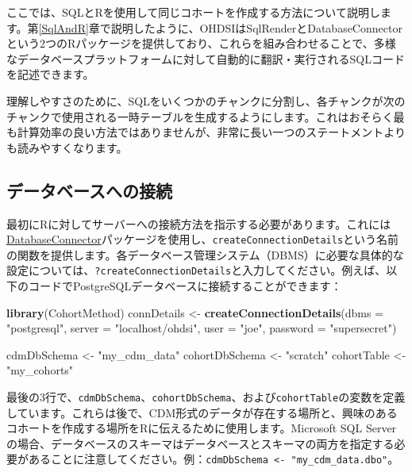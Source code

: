 \documentclass[
  11pt]{book}
\newenvironment{Shaded}{\begin{snugshade}}{\end{snugshade}}
\newcommand{\AttributeTok}[1]{\textcolor[rgb]{0.13,0.29,0.53}{#1}}
\newcommand{\FunctionTok}[1]{\textcolor[rgb]{0.13,0.29,0.53}{\textbf{#1}}}
\newcommand{\NormalTok}[1]{#1}
\newcommand{\OtherTok}[1]{\textcolor[rgb]{0.56,0.35,0.01}{#1}}
\newcommand{\StringTok}[1]{\textcolor[rgb]{0.31,0.60,0.02}{#1}}
\theoremstyle{definition}
\theoremstyle{definition}
\theoremstyle{definition}
\theoremstyle{definition}
\theoremstyle{remark}
\begin{document}
ここでは、SQLとRを使用して同じコホートを作成する方法について説明します。第\ref{SqlAndR}章で説明したように、OHDSIはSqlRenderとDatabaseConnectorという2つのRパッケージを提供しており、これらを組み合わせることで、多様なデータベースプラットフォームに対して自動的に翻訳・実行されるSQLコードを記述できます。

理解しやすさのために、SQLをいくつかのチャンクに分割し、各チャンクが次のチャンクで使用される一時テーブルを生成するようにします。これはおそらく最も計算効率の良い方法ではありませんが、非常に長い一つのステートメントよりも読みやすくなります。

\subsection{データベースへの接続}\label{ux30c7ux30fcux30bfux30d9ux30fcux30b9ux3078ux306eux63a5ux7d9a-1}

最初にRに対してサーバーへの接続方法を指示する必要があります。これには\href{https://ohdsi.github.io/DatabaseConnector/}{DatabaseConnector}パッケージを使用し、\texttt{createConnectionDetails}という名前の関数を提供します。各データベース管理システム（DBMS）に必要な具体的な設定については、\texttt{?createConnectionDetails}と入力してください。例えば、以下のコードでPostgreSQLデータベースに接続することができます：

\begin{Shaded}
\begin{Highlighting}[]
\FunctionTok{library}\NormalTok{(CohortMethod)}
\NormalTok{connDetails }\OtherTok{\textless{}{-}} \FunctionTok{createConnectionDetails}\NormalTok{(}\AttributeTok{dbms =} \StringTok{"postgresql"}\NormalTok{,}
                                       \AttributeTok{server =} \StringTok{"localhost/ohdsi"}\NormalTok{,}
                                       \AttributeTok{user =} \StringTok{"joe"}\NormalTok{,}
                                       \AttributeTok{password =} \StringTok{"supersecret"}\NormalTok{)}

\NormalTok{cdmDbSchema }\OtherTok{\textless{}{-}} \StringTok{"my\_cdm\_data"}
\NormalTok{cohortDbSchema }\OtherTok{\textless{}{-}} \StringTok{"scratch"}
\NormalTok{cohortTable }\OtherTok{\textless{}{-}} \StringTok{"my\_cohorts"}
\end{Highlighting}
\end{Shaded}

最後の3行で、\texttt{cdmDbSchema}、\texttt{cohortDbSchema}、および\texttt{cohortTable}の変数を定義しています。これらは後で、CDM形式のデータが存在する場所と、興味のあるコホートを作成する場所をRに伝えるために使用します。Microsoft SQL Serverの場合、データベースのスキーマはデータベースとスキーマの両方を指定する必要があることに注意してください。例：\texttt{cdmDbSchema\ \textless{}-\ "my\_cdm\_data.dbo"}。
\end{document}
